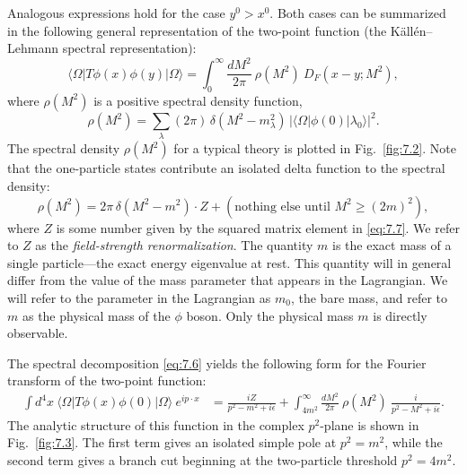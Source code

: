 Analogous expressions hold for the case $y^0 > x^0$.  Both cases can be
summarized in the following general representation of the two-point function
(the K\"all\'en--Lehmann spectral representation):
\begin{equation}
  \langle\Omega|T\phi(x)\phi(y)|\Omega\rangle
  = \int_0^{\infty} \frac{dM^2}{2\pi}\ \rho(M^2)\ D_F(x-y; M^2),
  \label{eq:7.6}
\end{equation}
where $\rho(M^2)$ is a positive spectral density function,
\begin{equation}
  \rho(M^2) = \sum_\lambda (2\pi)\,\delta(M^2 - m_\lambda^2)\,
    \bigl| \langle\Omega|\phi(0)|\lambda_0\rangle \bigr|^2 .
  \label{eq:7.7}
\end{equation}
The spectral density $\rho(M^2)$ for a typical theory is plotted in
Fig.~\ref{fig:7.2}.  Note that the one-particle states contribute an isolated
delta function to the spectral density:
\begin{equation}
  \rho(M^2) = 2\pi\,\delta(M^2-m^2)\cdot Z
    + (\text{nothing else until } M^2 \ge (2m)^2),
  \label{eq:7.8}
\end{equation}
where $Z$ is some number given by the squared matrix element in
\eqref{eq:7.7}.  We refer to $Z$ as the \emph{field-strength renormalization}.
The quantity $m$ is the exact mass of a single particle---the exact energy
eigenvalue at rest.  This quantity will in general differ from the value of
the mass parameter that appears in the Lagrangian.  We will refer to the
parameter in the Lagrangian as $m_0$, the bare mass, and refer to $m$ as the
physical mass of the $\phi$ boson.  Only the physical mass $m$ is directly
observable.

The spectral decomposition \eqref{eq:7.6} yields the following form for the
Fourier transform of the two-point function:
\begin{equation}
  \begin{aligned}
    \int d^4x\ \langle\Omega|T\phi(x)\phi(0)|\Omega\rangle\ e^{ip\cdot x}
    &= \frac{iZ}{p^2-m^2+i\epsilon}
      + \int_{4m^2}^{\infty} \frac{dM^2}{2\pi}\ \rho(M^2)\
        \frac{i}{p^2-M^2+i\epsilon} .
  \end{aligned}
  \label{eq:7.9}
\end{equation}
The analytic structure of this function in the complex $p^2$-plane is shown
in Fig.~\ref{fig:7.3}.  The first term gives an isolated simple pole at
$p^2 = m^2$, while the second term gives a branch cut beginning at the
two-particle threshold $p^2 = 4m^2$.

